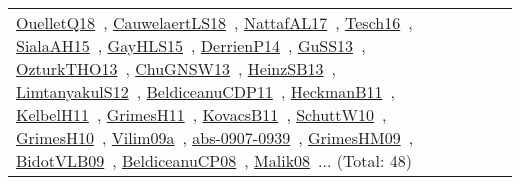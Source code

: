 {\begin{longtable}{lp{3cm}>{\raggedright\arraybackslash}p{6cm}>{\raggedright\arraybackslash}p{6cm}>{\raggedright\arraybackslash}p{8cm}}
\href{works/OuelletQ18.pdf}{OuelletQ18}~\cite{OuelletQ18}, \href{works/CauwelaertLS18.pdf}{CauwelaertLS18}~\cite{CauwelaertLS18}, \href{works/NattafAL17.pdf}{NattafAL17}~\cite{NattafAL17}, \href{works/Tesch16.pdf}{Tesch16}~\cite{Tesch16}, \href{works/SialaAH15.pdf}{SialaAH15}~\cite{SialaAH15}, \href{works/GayHLS15.pdf}{GayHLS15}~\cite{GayHLS15}, \href{works/DerrienP14.pdf}{DerrienP14}~\cite{DerrienP14}, \href{works/GuSS13.pdf}{GuSS13}~\cite{GuSS13}, \href{works/OzturkTHO13.pdf}{OzturkTHO13}~\cite{OzturkTHO13}, \href{works/ChuGNSW13.pdf}{ChuGNSW13}~\cite{ChuGNSW13}, \href{works/HeinzSB13.pdf}{HeinzSB13}~\cite{HeinzSB13}, \href{works/LimtanyakulS12.pdf}{LimtanyakulS12}~\cite{LimtanyakulS12}, \href{works/BeldiceanuCDP11.pdf}{BeldiceanuCDP11}~\cite{BeldiceanuCDP11}, \href{works/HeckmanB11.pdf}{HeckmanB11}~\cite{HeckmanB11}, \href{works/KelbelH11.pdf}{KelbelH11}~\cite{KelbelH11}, \href{works/GrimesH11.pdf}{GrimesH11}~\cite{GrimesH11}, \href{works/KovacsB11.pdf}{KovacsB11}~\cite{KovacsB11}, \href{works/SchuttW10.pdf}{SchuttW10}~\cite{SchuttW10}, \href{works/GrimesH10.pdf}{GrimesH10}~\cite{GrimesH10}, \href{works/Vilim09a.pdf}{Vilim09a}~\cite{Vilim09a}, \href{works/abs-0907-0939.pdf}{abs-0907-0939}~\cite{abs-0907-0939}, \href{works/GrimesHM09.pdf}{GrimesHM09}~\cite{GrimesHM09}, \href{works/BidotVLB09.pdf}{BidotVLB09}~\cite{BidotVLB09}, \href{works/BeldiceanuCP08.pdf}{BeldiceanuCP08}~\cite{BeldiceanuCP08}, \href{works/Malik08.pdf}{Malik08}~\cite{Malik08}... (Total: 48)\\

\end{longtable}}
